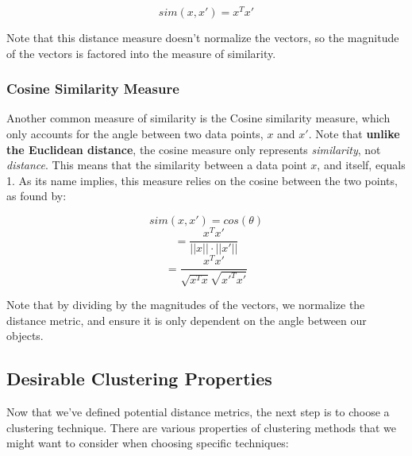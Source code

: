 \documentclass{article}
\begin{document}
\begin{equation}
	sim(x, x') = x^T x'
\end{equation}

Note that this distance measure doesn't normalize the vectors, so the magnitude of the vectors is factored into the measure of similarity.

\subsubsection{Cosine Similarity Measure}

Another common measure of similarity is the Cosine similarity measure, which only accounts for the angle between two data points, $x$ and $x'$. Note that \textbf{unlike the Euclidean distance}, the cosine measure only represents \textit{similarity}, not \textit{distance}. This means that the similarity between a data point $x$, and itself, equals 1. As its name implies, this measure relies on the cosine between the two points, as found by:

\begin{equation}
	sim(x, x') = cos(\theta)
\end{equation}
\begin{equation}
	= \frac{x^T x'}{||x|| \cdot ||x'||}
\end{equation}
\begin{equation}
	= \frac{x^T x'}{ \sqrt{x^T x} \sqrt{{x'}^T x'} }
\end{equation}

Note that by dividing by the magnitudes of the vectors, we normalize the distance metric, and ensure it is only dependent on the angle between our objects.

\subsection{Desirable Clustering Properties}

Now that we've defined potential distance metrics, the next step is to choose a clustering technique. There are various properties of clustering methods that we might want to consider when choosing specific techniques:
\end{document}

